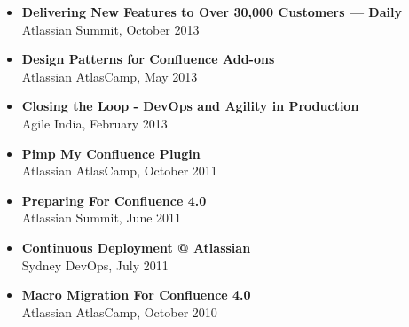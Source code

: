 \documentclass[a4paper]{article}
\begin{document}
\begin{itemize}
\item \textbf{Delivering New Features to Over 30,000 Customers --- Daily}\\Atlassian Summit, October 2013
\item \textbf{Design Patterns for Confluence Add-ons}\\Atlassian AtlasCamp, May 2013
\item \textbf{Closing the Loop - DevOps and Agility in Production}\\Agile India, February 2013
\item \textbf{Pimp My Confluence Plugin}\\Atlassian AtlasCamp, October 2011
\item \textbf{Preparing For Confluence 4.0}\\Atlassian Summit, June 2011
\item \textbf{Continuous Deployment @ Atlassian}\\Sydney DevOps, July 2011
\item \textbf{Macro Migration For Confluence 4.0}\\Atlassian AtlasCamp, October 2010
\end{itemize}
\end{document}
